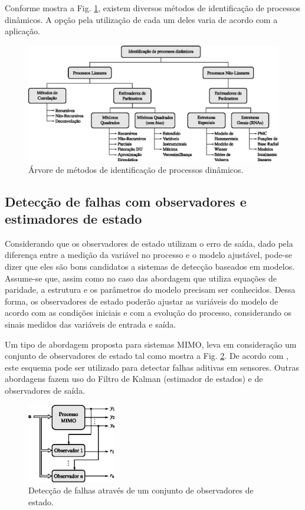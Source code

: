 Conforme mostra a Fig. \ref{fig:metodos_identificacao}, existem diversos métodos
de identificação de processos dinâmicos. A opção pela utilização de cada um
deles varia de acordo com a aplicação.

\begin{figure}[htb]
\centering
    \includegraphics[width=\textwidth]{imgs/detec_diag/eps/metodos_identificacao}
    \caption{Árvore de métodos de identificação de processos dinâmicos.}
    \label{fig:metodos_identificacao}
\end{figure}

\subsection{Detecção de falhas com observadores e estimadores de estado}
Considerando que os observadores de estado utilizam o erro de saída, dado pela
diferença entre a medição da variável no processo e o modelo ajustável, pode-se
dizer que eles são bons candidatos a sistemas de detecção baseados em modelos.
Assume-se que, assim como no caso das abordagem que utiliza equações de
paridade, a estrutura e os parâmetros do modelo precisam ser conhecidos. Dessa
forma, os observadores de estado poderão ajustar as variáveis do modelo de
acordo com as condições iniciais e com a evolução do processo, considerando os
sinais medidos das variáveis de entrada e saída.

Um tipo de abordagem proposta para sistemas MIMO, leva em consideração um
conjunto de observadores de estado tal como mostra a Fig.
\ref{fig:conj_obs_est}. De acordo com , este esquema
pode ser utilizado para detectar falhas aditivas em sensores. Outras abordagens
fazem uso do Filtro de Kalman (estimador de estados) e de observadores de saída. 

\begin{figure}[htb]
\centering
    \includegraphics[width=0.345\textwidth]{imgs/detec_diag/eps/conj_obs_est}
    \caption{Detecção de falhas através de um conjunto de observadores de
             estado.}
    \label{fig:conj_obs_est}
\end{figure}
 
